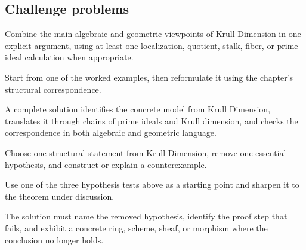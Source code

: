 \subsection*{Challenge problems}

\begin{exercise}\label{exr:vi29-expand-15}
Combine the main algebraic and geometric viewpoints of Krull Dimension in one explicit argument, using at least one localization, quotient, stalk, fiber, or prime-ideal calculation when appropriate.
\end{exercise}
\begin{hint}
Start from one of the worked examples, then reformulate it using the chapter's structural correspondence.
\end{hint}
\begin{solution}
A complete solution identifies the concrete model from Krull Dimension, translates it through chains of prime ideals and Krull dimension, and checks the correspondence in both algebraic and geometric language.
\end{solution}

\begin{exercise}\label{exr:vi29-expand-16}
Choose one structural statement from Krull Dimension, remove one essential hypothesis, and construct or explain a counterexample.
\end{exercise}
\begin{hint}
Use one of the three hypothesis tests above as a starting point and sharpen it to the theorem under discussion.
\end{hint}
\begin{solution}
The solution must name the removed hypothesis, identify the proof step that fails, and exhibit a concrete ring, scheme, sheaf, or morphism where the conclusion no longer holds.
\end{solution}

